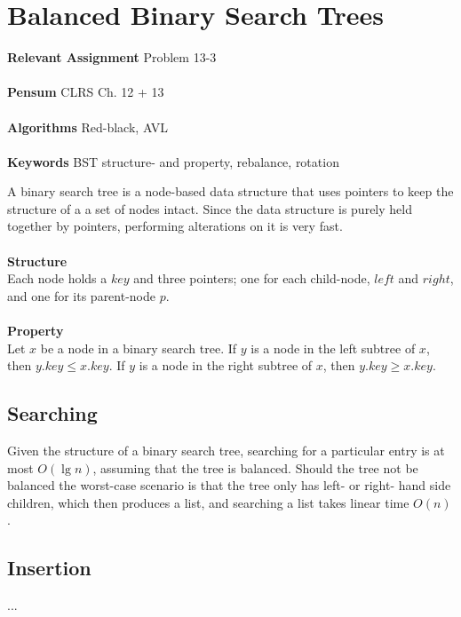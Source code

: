 
\chapter{Balanced Binary Search Trees}
\label{ch:balancedbinarysearchtrees}

\textbf{Relevant Assignment} Problem 13-3\\\\
\textbf{Pensum} CLRS Ch. 12 + 13\\\\
\textbf{Algorithms} Red-black, AVL\\\\
\textbf{Keywords} BST structure- and property, rebalance, rotation
\vspace{1in}

\noindent A binary search tree is a node-based data structure that uses
pointers to keep the structure of a a set of nodes intact. Since the data
structure is purely held together by pointers, performing alterations on it
is very fast.
\\\\
\noindent \textbf{Structure} \\
Each node holds a $key$ and three pointers; one for each child-node, $left$
and $right$, and one for its parent-node $p$.
\\\\
\noindent \textbf{Property} \\
Let $x$ be a node in a binary search tree. If $y$ is a node in the left
subtree of $x$, then $y.key \leq x.key$. If $y$ is a node in the right
subtree of $x$, then $y.key \geq x.key$.

\newpage
\section{Searching}
Given the structure of a binary search tree, searching for a particular entry
is at most $O(\lg n)$, assuming that the tree is balanced. Should the tree not
be balanced the worst-case scenario is that the tree only has left- or right-
hand side children, which then produces a list, and searching a list takes
linear time $O(n)$.
 
\section{Insertion}
...


